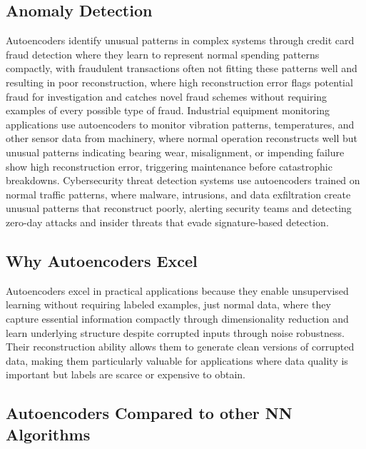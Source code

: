 \subsection{Anomaly Detection}

Autoencoders identify unusual patterns in complex systems through credit card fraud detection where they learn to represent normal spending patterns compactly, with fraudulent transactions often not fitting these patterns well and resulting in poor reconstruction, where high reconstruction error flags potential fraud for investigation and catches novel fraud schemes without requiring examples of every possible type of fraud. Industrial equipment monitoring applications use autoencoders to monitor vibration patterns, temperatures, and other sensor data from machinery, where normal operation reconstructs well but unusual patterns indicating bearing wear, misalignment, or impending failure show high reconstruction error, triggering maintenance before catastrophic breakdowns. Cybersecurity threat detection systems use autoencoders trained on normal traffic patterns, where malware, intrusions, and data exfiltration create unusual patterns that reconstruct poorly, alerting security teams and detecting zero-day attacks and insider threats that evade signature-based detection.

\subsection{Why Autoencoders Excel}

Autoencoders excel in practical applications because they enable unsupervised learning without requiring labeled examples, just normal data, where they capture essential information compactly through dimensionality reduction and learn underlying structure despite corrupted inputs through noise robustness. Their reconstruction ability allows them to generate clean versions of corrupted data, making them particularly valuable for applications where data quality is important but labels are scarce or expensive to obtain.

\subsection{Autoencoders Compared to other NN Algorithms}

